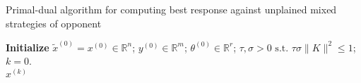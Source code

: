 \documentclass[a4paper,10pt,journal]{IEEEtran}
\newtheorem*{remark}{Remark}
\begin{document}
\begin{algorithm}[htb]
\caption{Primal-dual algorithm for computing best response against unplained mixed strategies of opponent}%
\textbf{Initialize} $\tilde{x}^{(0)} = x^{(0)} \in \mathbb{R}^n$; $y^{(0)} \in \mathbb{R}^{m}$; $\theta^{(0)} \in \mathbb{R}^{r}$;
$\tau, \sigma > 0 \text{ s.t. }\tau\sigma \|K\|^2 \le 1$; $k = 0$.\\
 \Return $x^{(k)}$
\label{Tab:pseudocode_lbfgs}
\end{algorithm}


\end{document}
